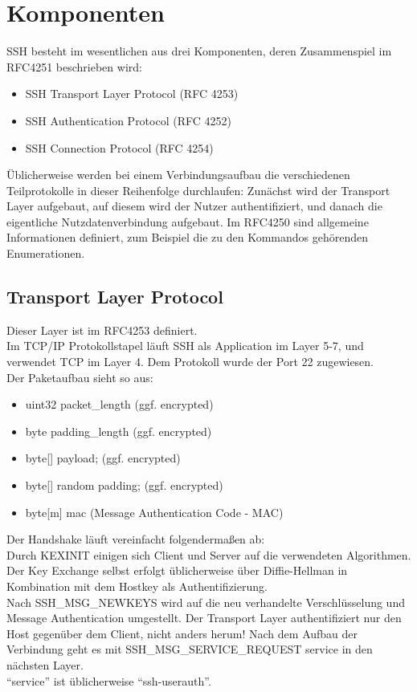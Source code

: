 \documentclass[fleqn,10pt]{SelfArx} %
\begin{document}
\section{Komponenten}
SSH besteht im wesentlichen aus drei Komponenten, deren Zusammenspiel im RFC4251 beschrieben wird:
\begin{itemize}
	\item SSH Transport Layer Protocol (RFC 4253)
	\item SSH Authentication Protocol (RFC 4252)
	\item SSH Connection Protocol (RFC 4254)
\end{itemize}
Üblicherweise werden bei einem Verbindungsaufbau die verschiedenen Teilprotokolle in dieser Reihenfolge durchlaufen: Zunächst wird der Transport Layer aufgebaut, auf diesem wird der Nutzer authentifiziert, und danach die eigentliche Nutzdatenverbindung aufgebaut.\newline
Im RFC4250 sind allgemeine Informationen definiert, zum Beispiel die zu den Kommandos gehörenden Enumerationen.
\subsection{Transport Layer Protocol}
Dieser Layer ist im RFC4253 definiert.\\	
Im TCP/IP Protokollstapel läuft SSH als Application im Layer 5-7, und verwendet TCP im Layer 4. Dem Protokoll wurde der Port 22 zugewiesen.\\	
Der Paketaufbau sieht so aus:	
\begin{itemize}	
	\item uint32 packet\_length (ggf. encrypted)	
	\item byte padding\_length (ggf. encrypted)	
	\item byte[] payload; (ggf. encrypted)	
	\item byte[] random padding; (ggf. encrypted)	
	\item byte[m] mac (Message Authentication Code - MAC)	
\end{itemize}	
Der Handshake läuft vereinfacht folgendermaßen ab:\\	
Durch KEXINIT einigen sich Client und Server auf die verwendeten Algorithmen.\\	
Der Key Exchange selbst erfolgt üblicherweise über Diffie-Hellman in Kombination mit dem Hostkey als Authentifizierung.\\	
Nach SSH\_MSG\_NEWKEYS wird auf die neu verhandelte Verschlüsselung und Message Authentication umgestellt.	
Der Transport Layer authentifiziert nur den Host gegenüber dem Client, nicht anders herum!	
Nach dem Aufbau der Verbindung geht es mit SSH\_MSG\_SERVICE\_REQUEST service in den nächsten Layer.\\	
\enquote{service} ist üblicherweise \enquote{ssh-userauth}.	
\end{document}

